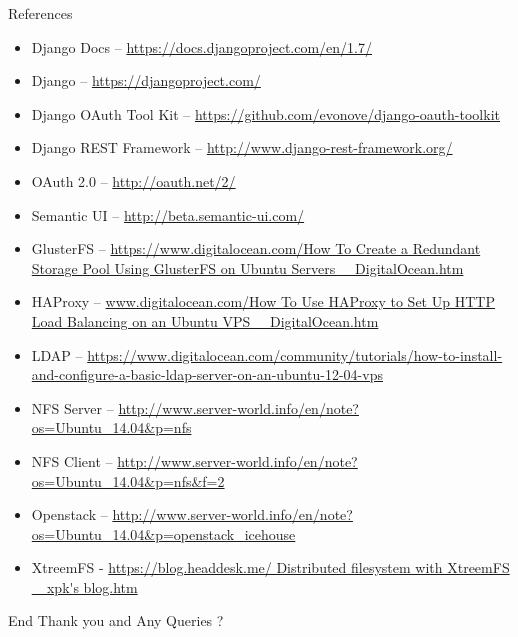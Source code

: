\documentclass[10pt,xcolor=dvipsnames]{beamer}
\begin{document}
\begin{frame}[allowframebreaks]{References}
\small
\begin{itemize}
	\item Django Docs -- \url{https://docs.djangoproject.com/en/1.7/}
	\item Django -- \url{https://djangoproject.com/}
	\item Django OAuth Tool Kit -- \url{https://github.com/evonove/django-oauth-toolkit}
	\item Django REST Framework -- \url{http://www.django-rest-framework.org/}
	\item OAuth 2.0 -- \url{http://oauth.net/2/}
	\item Semantic UI -- \url{http://beta.semantic-ui.com/}
	\item GlusterFS -- \url{https://www.digitalocean.com/How To Create a Redundant Storage Pool Using GlusterFS on Ubuntu Servers _ DigitalOcean.htm}
	\item HAProxy -- \url{www.digitalocean.com/How To Use HAProxy to Set Up HTTP Load Balancing on an Ubuntu VPS _ DigitalOcean.htm}
	\item LDAP -- \url{https://www.digitalocean.com/community/tutorials/how-to-install-and-configure-a-basic-ldap-server-on-an-ubuntu-12-04-vps}
	\item NFS Server -- \url{http://www.server-world.info/en/note?os=Ubuntu_14.04&p=nfs}
	\item NFS Client -- \url{http://www.server-world.info/en/note?os=Ubuntu_14.04&p=nfs&f=2}
	\item Openstack -- \url{http://www.server-world.info/en/note?os=Ubuntu_14.04&p=openstack_icehouse}
\item XtreemFS - \url{https://blog.headdesk.me/ Distributed filesystem with XtreemFS _ xpk's blog.htm}
\end{itemize}
\end{frame}


\begin{frame}{End}
Thank you and Any Queries ?
\end{frame}
\end{document}
